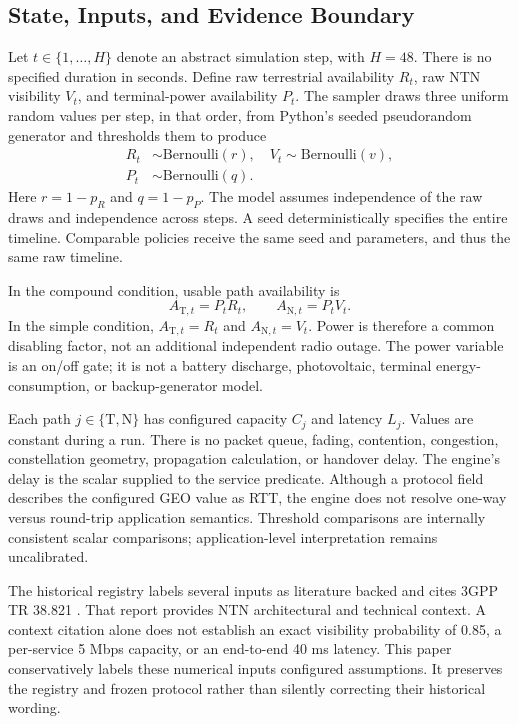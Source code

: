 \documentclass[10pt,twocolumn]{article}
\newcommand{\TN}{\mathrm{T}}
\newcommand{\NTN}{\mathrm{N}}
\begin{document}
\subsection{State, Inputs, and Evidence Boundary}
Let $t\in\{1,\ldots,H\}$ denote an abstract simulation step, with $H=48$. There is no specified duration in seconds. Define raw terrestrial availability $R_t$, raw NTN visibility $V_t$, and terminal-power availability $P_t$. The sampler draws three uniform random values per step, in that order, from Python's seeded pseudorandom generator and thresholds them to produce
\begin{align}
 R_t&\sim\mathrm{Bernoulli}(r),\quad V_t\sim\mathrm{Bernoulli}(v),\\
 P_t&\sim\mathrm{Bernoulli}(q).
\end{align}
Here $r=1-p_R$ and $q=1-p_P$. The model assumes independence of the raw draws and independence across steps. A seed deterministically specifies the entire timeline. Comparable policies receive the same seed and parameters, and thus the same raw timeline.

In the compound condition, usable path availability is
\begin{equation}\label{eq:availability}
 A_{\TN,t}=P_tR_t,\qquad A_{\NTN,t}=P_tV_t.
\end{equation}
In the simple condition, $A_{\TN,t}=R_t$ and $A_{\NTN,t}=V_t$. Power is therefore a common disabling factor, not an additional independent radio outage. The power variable is an on/off gate; it is not a battery discharge, photovoltaic, terminal energy-consumption, or backup-generator model.

Each path $j\in\{\TN,\NTN\}$ has configured capacity $C_j$ and latency $L_j$. Values are constant during a run. There is no packet queue, fading, contention, congestion, constellation geometry, propagation calculation, or handover delay. The engine's delay is the scalar supplied to the service predicate. Although a protocol field describes the configured GEO value as RTT, the engine does not resolve one-way versus round-trip application semantics. Threshold comparisons are internally consistent scalar comparisons; application-level interpretation remains uncalibrated.

The historical registry labels several inputs as literature backed and cites 3GPP TR 38.821 \cite{tr38821}. That report provides NTN architectural and technical context. A context citation alone does not establish an exact visibility probability of 0.85, a per-service 5 Mbps capacity, or an end-to-end 40 ms latency. This paper conservatively labels these numerical inputs configured assumptions. It preserves the registry and frozen protocol rather than silently correcting their historical wording.
\end{document}
